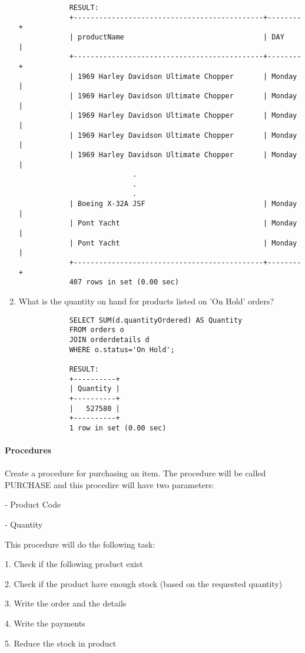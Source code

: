 \documentclass{article}
\begin{document}
\begin{enumerate}
\begin{verbatim}
			RESULT:
			+---------------------------------------------+--------+
			| productName                                 | DAY    |
			+---------------------------------------------+--------+
			| 1969 Harley Davidson Ultimate Chopper       | Monday |
			| 1969 Harley Davidson Ultimate Chopper       | Monday |
			| 1969 Harley Davidson Ultimate Chopper       | Monday |
			| 1969 Harley Davidson Ultimate Chopper       | Monday |
			| 1969 Harley Davidson Ultimate Chopper       | Monday |
                           .
                           .
                           .
			| Boeing X-32A JSF                            | Monday |
			| Pont Yacht                                  | Monday |
			| Pont Yacht                                  | Monday |
			+---------------------------------------------+--------+
			407 rows in set (0.00 sec)
			\end{verbatim}
		\item What is the quantity on hand for products listed on 'On Hold' orders?
			\begin{verbatim}
			SELECT SUM(d.quantityOrdered) AS Quantity
			FROM orders o
			JOIN orderdetails d
			WHERE o.status='On Hold';
			
			RESULT:
			+----------+
			| Quantity |
			+----------+
			|   527580 |
			+----------+
			1 row in set (0.00 sec)
			\end{verbatim}
	\end{enumerate}
	\paragraph{Procedures}
	\paragraph{}
	Create a procedure for purchasing an item. The procedure will be called PURCHASE and this procedire will have two parameters:
	
	-	Product Code
	
	-	Quantity
	
	This procedure will do the following task:

	1.	Check if the following product exist 
	
	2.	Check if the product have enough stock (based on the requested  quantity)
	
	3.	Write the order and the details
	
	4.	Write the payments
	
	5.	Reduce the stock in product
	
\end{document}
